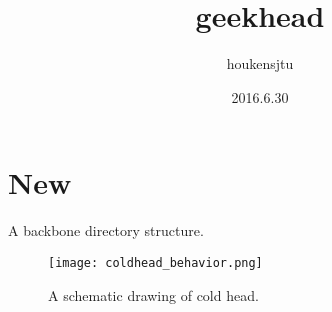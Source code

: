 \title{geekhead}
\author{houkensjtu}
\date{2016.6.30}
\maketitle
\section {New}
A backbone directory structure.
\begin{figure}[h]
\begin{center}
\texttt{[image: coldhead\_behavior.png]}
\caption{A schematic drawing of cold head.}
\end{center}
\end{figure}
